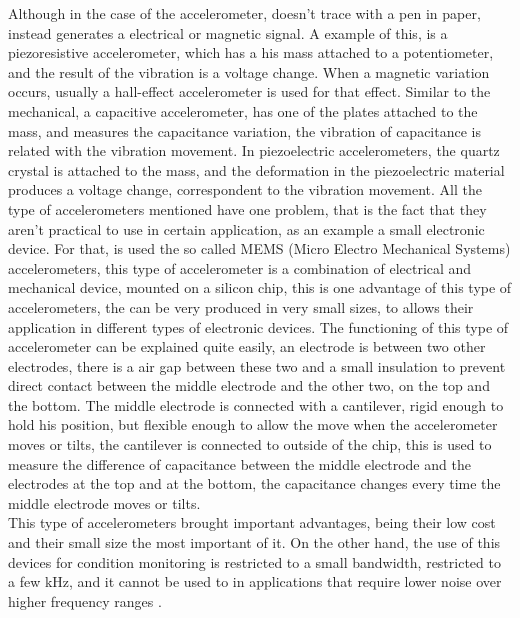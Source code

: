 Although in the case of the accelerometer, doesn't trace with a pen in paper, instead generates a electrical or magnetic signal. A example of this, is a piezoresistive accelerometer, which has a his mass attached to a potentiometer, and the result of the vibration is a voltage change. When a magnetic variation occurs, usually a hall-effect accelerometer is used for that effect.  
Similar to the mechanical, a capacitive accelerometer, has one of the plates attached to the mass, and measures the capacitance variation, the vibration of capacitance is related with the vibration movement. 
In piezoelectric accelerometers, the quartz crystal is attached to the mass, and the deformation in the piezoelectric material produces a voltage change, correspondent to the vibration movement.
All the type of accelerometers mentioned have one problem, that is the fact that they aren't practical to use in certain application, as an example a small electronic device. For that, is used the so called MEMS (Micro Electro Mechanical Systems) accelerometers, this type of accelerometer is a combination of electrical and mechanical device, mounted on a silicon chip, this is one advantage of this type of accelerometers, the can be very produced in very small sizes, to allows their application in different types of electronic devices. The functioning of this type of accelerometer can be explained quite easily, an electrode is between two other electrodes, there is a air gap between these two and a small insulation to prevent direct contact between the middle electrode and the other two, on the top and the bottom. The middle electrode is connected with a cantilever, rigid enough to hold his position, but flexible enough to allow the move when the accelerometer moves or tilts, the cantilever is connected to outside of the chip, this is used to measure the difference of capacitance between the middle electrode and the electrodes at the top and at the bottom, the capacitance changes every time the middle electrode moves or tilts.\\

This type of accelerometers brought important advantages, being their low cost and their small size the most important of it. On the other hand, the use of this devices for condition monitoring is restricted to a small bandwidth, restricted to a few kHz, and it cannot be used to in applications that require lower noise over higher frequency ranges \cite{WhatYouNeed}\cite{HowAccelerometersWork2009}.

\clearpage
\printbibliography[heading=subbibliography]
